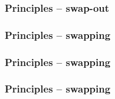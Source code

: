 
\begin{frame}
  \frametitle{Principles -- swap-out}

  \begin{center}
  \end{center}

\end{frame}


\begin{frame}
  \frametitle{Principles -- swapping}

  \begin{center}
  \end{center}

\end{frame}


\begin{frame}
  \frametitle{Principles -- swapping}

  \begin{center}
  \end{center}

\end{frame}


\begin{frame}
  \frametitle{Principles -- swapping}

  \begin{center}
  \end{center}

\end{frame}


